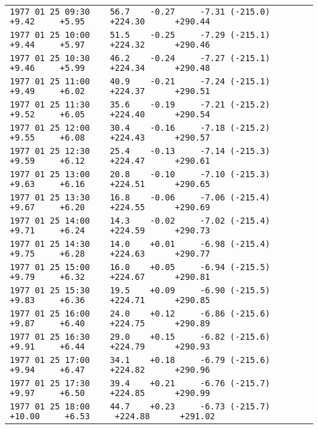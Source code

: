 \begin{tiny}
\begin{center}
\begin{tabular}{|l|}
\verb|1977 01 25 09:30    56.7    -0.27     -7.31 (-215.0)      +9.42     +5.95     +224.30      +290.44|\\
\verb|1977 01 25 10:00    51.5    -0.25     -7.29 (-215.1)      +9.44     +5.97     +224.32      +290.46|\\
\verb|1977 01 25 10:30    46.2    -0.24     -7.27 (-215.1)      +9.46     +5.99     +224.34      +290.48|\\
\verb|1977 01 25 11:00    40.9    -0.21     -7.24 (-215.1)      +9.49     +6.02     +224.37      +290.51|\\
\verb|1977 01 25 11:30    35.6    -0.19     -7.21 (-215.2)      +9.52     +6.05     +224.40      +290.54|\\
\verb|1977 01 25 12:00    30.4    -0.16     -7.18 (-215.2)      +9.55     +6.08     +224.43      +290.57|\\
\verb|1977 01 25 12:30    25.4    -0.13     -7.14 (-215.3)      +9.59     +6.12     +224.47      +290.61|\\
\verb|1977 01 25 13:00    20.8    -0.10     -7.10 (-215.3)      +9.63     +6.16     +224.51      +290.65|\\
\verb|1977 01 25 13:30    16.8    -0.06     -7.06 (-215.4)      +9.67     +6.20     +224.55      +290.69|\\
\verb|1977 01 25 14:00    14.3    -0.02     -7.02 (-215.4)      +9.71     +6.24     +224.59      +290.73|\\
\verb|1977 01 25 14:30    14.0    +0.01     -6.98 (-215.4)      +9.75     +6.28     +224.63      +290.77|\\
\verb|1977 01 25 15:00    16.0    +0.05     -6.94 (-215.5)      +9.79     +6.32     +224.67      +290.81|\\
\verb|1977 01 25 15:30    19.5    +0.09     -6.90 (-215.5)      +9.83     +6.36     +224.71      +290.85|\\
\verb|1977 01 25 16:00    24.0    +0.12     -6.86 (-215.6)      +9.87     +6.40     +224.75      +290.89|\\
\verb|1977 01 25 16:30    29.0    +0.15     -6.82 (-215.6)      +9.91     +6.44     +224.79      +290.93|\\
\verb|1977 01 25 17:00    34.1    +0.18     -6.79 (-215.6)      +9.94     +6.47     +224.82      +290.96|\\
\verb|1977 01 25 17:30    39.4    +0.21     -6.76 (-215.7)      +9.97     +6.50     +224.85      +290.99|\\
\verb|1977 01 25 18:00    44.7    +0.23     -6.73 (-215.7)     +10.00     +6.53     +224.88      +291.02|\\

\end{tabular}
\end{center}
\end{tiny}
